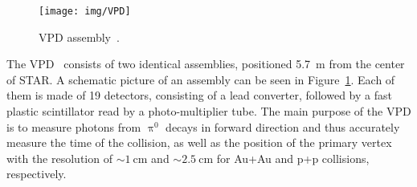 \begin{figure}[!htb]
\begin{center}
 \texttt{[image: img/VPD]}\\
\end{center}
\caption{\label{VPDassembly}VPD assembly~\cite{VPD}.}
\end{figure}

The VPD~\cite{VPD} consists of two identical assemblies, positioned \SI{5.7}{\metre} from the center of STAR\@. A schematic 
picture of an assembly can be seen in Figure~\ref{VPDassembly}. Each of them is made of 19 detectors, consisting of a lead 
converter, followed by a fast plastic scintillator read by a photo-multiplier tube. The main purpose of the VPD is to measure 
photons from $\uppi^0$ decays in forward direction and thus accurately measure the time of the collision, as well as 
the position of the primary vertex with the resolution of $\sim \SI{1}{\centi\metre}$ and  $\sim \SI{2.5}{\centi\metre}$ 
for Au+Au and p+p collisions, respectively.


